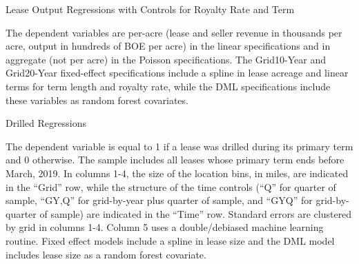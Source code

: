 \begin{appendices}
\begin{table}[H]
	\begin{center}
	\begin{threeparttable}
	\caption{Lease Output Regressions with Controls for Royalty Rate and Term}
	\label{tab:OutputWithRoyaltyTerm}
	\small
	            
		\begin{tablenotes}
		\footnotesize
		\item The dependent variables are per-acre (lease and seller revenue in thousands per acre, output in hundreds of BOE per acre) in the linear specifications and in aggregate (not per acre) in the Poisson specifications.  The Grid10-Year and Grid20-Year fixed-effect specifications include a spline in lease acreage and linear terms for term length and royalty rate, while the DML specifications include these variables as  random forest covariates.    
		\end{tablenotes}	   
	\end{threeparttable}
	\end{center}
\end{table}

\addtolength{\tabcolsep}{10pt}
\begin{table}[H]
	\begin{center}
	\begin{threeparttable}
		\caption{Drilled Regressions}\label{tab:drilledregs}
		 \small
			             
			\footnotesize
			\begin{tablenotes}
				\item The dependent variable is equal to 1 if a lease was drilled during its primary term and 0 otherwise.  The sample includes all leases whose primary term ends before March, 2019.  In columns 1-4, the size of the location bins, in miles, are indicated in the ``Grid'' row, while the structure of the time controls (``Q'' for quarter of sample, ``GY,Q'' for grid-by-year plus quarter of sample, and ``GYQ'' for grid-by-quarter of sample) are indicated in the ``Time'' row.  Standard errors are clustered by grid in columns 1-4.  Column 5 uses a double/debiased machine learning routine.  Fixed effect models include a spline in lease size and the DML model includes lease size as a random forest covariate.
			\end{tablenotes} 
	\end{threeparttable}
	\end{center}
\end{table}
	

\end{appendices}
